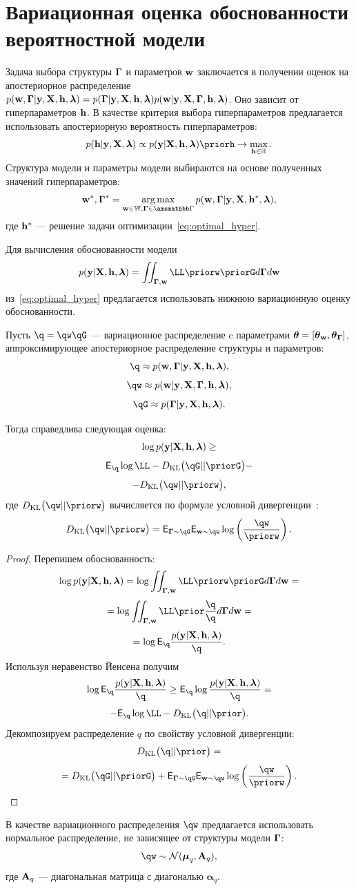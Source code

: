 \section{Вариационная оценка обоснованности вероятностной модели}
Задача выбора структуры $\boldsymbol{\Gamma}$ и параметров $\mathbf{w}$ заключается в получении оценок на апостериорное распределение $p(\mathbf{w}, \boldsymbol{\Gamma}|\mathbf{y}, \mathbf{X}, \mathbf{h},\boldsymbol{\lambda}) = p(\boldsymbol{\Gamma}|\mathbf{y}, \mathbf{X}, \mathbf{h},\boldsymbol{\lambda})p(\mathbf{w}|\mathbf{y}, \mathbf{X}, \boldsymbol{\Gamma}, \mathbf{h},\boldsymbol{\lambda})$. Оно зависит от гиперпараметров $\mathbf{h}$. 
В качестве критерия выбора гиперпараметров предлагается использовать апостериорную вероятность гиперпараметров:
\begin{equation}
\label{eq:optimal_hyper}
    \posth \propto \EV \priorh \to \max_{\h \in \Hb}.
\end{equation}
Структура модели и параметры модели выбираются на основе полученных значений гиперпараметров:
\[
    \w^*,\G^* = \argmax_{\w \in \Wb, \G \in \Gb} p(\w, \G|\y, \X, \h^*, \lam ),
\]
где $\mathbf{h}^*$ --- решение задачи оптимизации~\eqref{eq:optimal_hyper}.

Для вычисления обоснованности модели $$\EV = \iint_{\G, \w}\LL \priorw \priorG d\G d\w$$ из~\eqref{eq:optimal_hyper} предлагается использовать нижнюю вариационную оценку обоснованности.

\begin{theorem}
Пусть $\q = \qw \qG$ --- вариационное распределение c параметрами $\boldsymbol{\theta}= [\boldsymbol{\theta}_\mathbf{w}, \boldsymbol{\theta}_{\boldsymbol{\Gamma}} ]$, аппроксимирующее апостериорное распределение структуры и параметров:
\[
    \q \approx \post,
\]
\[
    \qw  \approx \postw,
\]
\[
    \qG \approx \postG.
\]

Тогда справедлива следующая оценка:
\begin{equation}
\label{eq:full_elbo}
\log p(\mathbf{y}|\mathbf{X}, \mathbf{h},\boldsymbol{\lambda}) \geq
\end{equation}
\[
 \E_{\q}  \log \LL - \KL{\qG}{\priorG} - 
\]
\[
 - \KL{\qw}{\priorw},
\]
где $\KL{\qw}{\priorw}$ вычисляется по формуле условной дивергенции~\cite{TODO}:
\[
\KL{\qw}{\priorw} = \E_{\G \sim \qG} \E_{\w \sim \qw} \log \left(\frac{\qw}{\priorw}\right).
\]
\end{theorem}

\begin{proof}
Перепишем обоснованность:
\[
\log \EV  =  \log \iint_{\G,\w} \LL \priorw \priorG d\G d\w  =
\]
\[
   = \log\iint_{\G,\w} \LL \prior  \frac{\q}{\q}d\G d\w =
\]
\[
  =  \log \E_{\q} \frac{\EV}{\q}.
\]
Используя неравенство Йенсена получим 
\[
 \log \E_{\q} \frac{\EV}{\q} \geq  \E_{\q}\log \frac{\EV}{\q} = 
\]
\[
 -  \E_{\q} \log \LL - \KL{\q}{\prior}.
\]
Декомпозируем распределение $q$ по свойству условной дивергенции:
\[
\KL{\q}{\prior} = 
\]
\begin{equation}
\label{eq:kl_full}
= \KL{\qG}{\priorG} + \E_{\G \sim \qG} \E_{\w \sim \qw} \log \left(\frac{\qw}{\priorw}\right).    
\end{equation}
\end{proof}
В качестве вариационного распределения $\qw$ предлагается использовать нормальное распределение, не зависящее от структуры модели $\boldsymbol{\Gamma}$:
\[
    \qw  \sim \mathcal{N}(\boldsymbol{\mu}_q, \A_q), 
\]
где $\mathbf{A}_q$ --- диагональная матрица с диагональю $\boldsymbol{\alpha}_q$.

